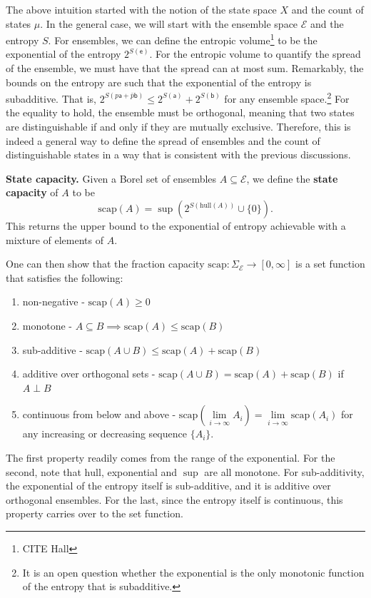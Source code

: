 \documentclass[10pt,twocolumn, nofootinbib]{revtex4-2}
\newcommand\hull{\mathrm{hull}}
\newcommand\capacity{\mathrm{scap}}
\newcommand{\ens}[1][e] {\mathsf{#1}} %
\newcommand{\Ens}[1][E] {\mathcal{#1}} %
\def\ortho{\perp}
\begin{document}
The above intuition started with the notion of the state space $X$ and the count of states $\mu$. In the general case, we will start with the ensemble space $\Ens$ and the entropy $S$. For ensembles, we can define the entropic volume\footnote{CITE Hall} to be the exponential of the entropy $2^{S(\ens)}$. For the entropic volume to quantify the spread of the ensemble, we must have that the spread can at most sum. Remarkably, the bounds on the entropy are such that the exponential of the entropy is subadditive. That is, $2^{S(p\ens[a]+\bar{p}\ens[b])} \leq 2^{S(\ens[a])} + 2^{S(\ens[b])}$ for any ensemble space.\footnote{It is an open question whether the exponential is the only monotonic function of the entropy that is subadditive.} For the equality to hold, the ensemble must be orthogonal, meaning that two states are distinguishable if and only if they are mutually exclusive. Therefore, this is indeed a general way to define the spread of ensembles and the count of distinguishable states in a way that is consistent with the previous discussions.

\textbf{State capacity.} Given a Borel set of ensembles $A \subseteq \Ens$, we define the \textbf{state capacity} of $A$ to be
\begin{equation}
\capacity(A) = \sup(2^{S(\hull(A))}\cup\{0\}).
\end{equation}
This returns the upper bound to the exponential of entropy achievable with a mixture of elements of $A$.

One can then show that the fraction capacity $\capacity : \Sigma_{\Ens} \to [0,\infty]$ is a set function that satisfies the following:
\begin{enumerate}
	\item non-negative - $\capacity(A)\geq 0$
	\item monotone - $A \subseteq B \implies \capacity(A) \leq \capacity(B)$
	\item sub-additive - $\capacity(A \cup B) \leq \capacity(A) + \capacity(B)$
	\item additive over orthogonal sets - $\capacity(A \cup B) = \capacity(A) + \capacity(B)$ if $A \ortho B$
	\item continuous from below and above - $\capacity(\lim\limits_{i \to \infty} A_i) = \lim\limits_{i \to \infty} \capacity(A_i)$ for any increasing or decreasing sequence $\{A_i\}$.
\end{enumerate}

The first property readily comes from the range of the exponential. For the second, note that $\hull$, exponential and $\sup$ are all monotone. For sub-additivity, the exponential of the entropy itself is sub-additive, and it is additive over orthogonal ensembles. For the last, since the entropy itself  is continuous, this property carries over to the set function.
\end{document}
